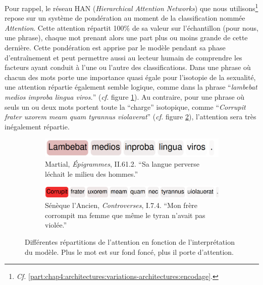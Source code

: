 
Pour rappel, le réseau HAN (\textit{Hierarchical Attention Networks}) que nous utilisons\footnote{\textit{Cf.} \ref{part:chap4:architectures:variations-architectures:encodage}.} repose sur un système de pondération au moment de la classification nommée \textit{Attention}. Cette attention répartit 100\% de sa valeur sur l'échantillon (pour nous, une phrase), chaque mot prenant alors une part plus ou moins grande de cette dernière. Cette pondération est apprise par le modèle pendant sa phase d'entraînement et peut permettre aussi au lecteur humain de comprendre les facteurs ayant conduit à l'une ou l'autre des classifications. Dans une phrase où chacun des mots porte une importance quasi égale pour l'isotopie de la sexualité, une attention répartie également semble logique, comme dans la phrase \enquote{\textit{lambebat medios improba lingua viros.}} (\textit{cf.} figure \ref{fig:chap4:attention:repartie}). Au contraire, pour une phrase où seuls un ou deux mots portent toute la \enquote{charge} isotopique, comme \enquote{\textit{Corrupit frater uxorem meam quam tyrannus violaverat}} (\textit{cf.} figure \ref{fig:chap4:attention:mono}), l'attention sera très inégalement répartie.

\begin{figure}
     \centering
     \begin{subfigure}[t]{0.45\textwidth}
         \centering
         \includegraphics[width=\textwidth]{figures/chap4/attention.png}
         \caption{Martial, \textit{Épigrammes}, II.61.2. \enquote{Sa langue perverse léchait le milieu des hommes.}}
         \label{fig:chap4:attention:repartie}
     \end{subfigure}
     \hfill
     \begin{subfigure}[t]{0.45\textwidth}
         \centering
         \includegraphics[width=\textwidth]{figures/chap4/attention2.png}
         \caption{Sénèque l'Ancien, \textit{Controverses}, I.7.4. \enquote{Mon frère corrompit ma femme que même le tyran n'avait pas violée.}}
         \label{fig:chap4:attention:mono}
     \end{subfigure}
    \caption{Différentes répartitions de l'attention en fonction de l'interprétation du modèle. Plus le mot est sur fond foncé, plus il porte d'attention.}
    \label{fig:chap4:attention}
\end{figure}

